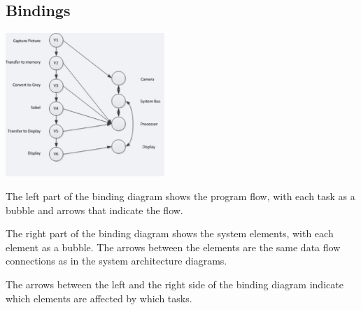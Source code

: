 	\subsection{Bindings}
		\begin{multicols}{2}
			\includegraphics[width=0.45\textwidth]{./pictures/bindings.png} 
			\begin{compactitem}
			  \item The left part of the binding diagram shows the program flow, with each task as a bubble and arrows that indicate the flow. 
			  \item The right part of the binding diagram shows the system elements, with each element as a bubble. The arrows between the elements are the same data flow connections as in the system architecture diagrams.
			  \item The arrows between the left and the right side of the binding diagram indicate which elements are affected by which tasks.
			\end{compactitem}		
		\end{multicols}